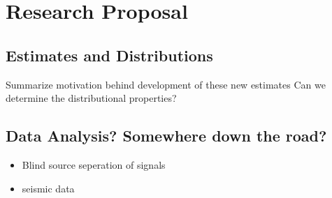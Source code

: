 \chapter{Research Proposal}\label{chap:chap5}

\section{Estimates and Distributions}
Summarize motivation behind development of these new estimates Can we determine the distributional properties?

\section{Data Analysis? Somewhere down the road?}
\begin{itemize}
    \item Blind source seperation of signals
    \item seismic data
\end{itemize}
